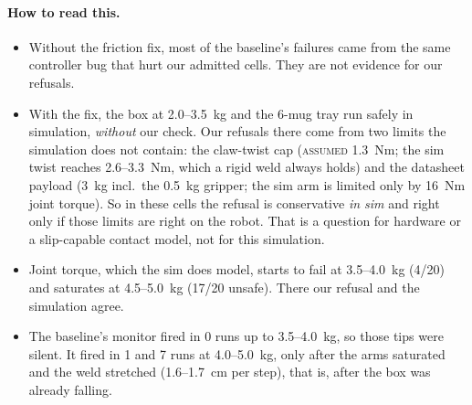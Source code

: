 \documentclass[11pt,a4paper]{article}
\newcommand{\lab}[1]{\textsc{#1}}
\begin{document}
\paragraph{How to read this.}
\begin{itemize}
\item Without the friction fix, most of the baseline's failures came from the same controller bug that hurt our admitted cells.
They are not evidence for our refusals.
\item With the fix, the box at 2.0--3.5~kg and the 6-mug tray run safely in simulation, \emph{without} our check. Our refusals
there come from two limits the simulation does not contain: the claw-twist cap (\lab{assumed} 1.3~Nm; the sim twist reaches
2.6--3.3~Nm, which a rigid weld always holds) and the datasheet payload (3~kg incl.\ the 0.5~kg gripper; the sim arm is limited only
by 16~Nm joint torque). So in these cells the refusal is conservative \emph{in sim} and right only if those limits are right on
the robot. That is a question for hardware or a slip-capable contact model, not for this simulation.
\item Joint torque, which the sim does model, starts to fail at 3.5--4.0~kg (4/20) and saturates at 4.5--5.0~kg (17/20 unsafe).
There our refusal and the simulation agree.
\item The baseline's monitor fired in 0 runs up to 3.5--4.0~kg, so those tips were silent. It fired in 1 and 7 runs at 4.0--5.0~kg,
only after the arms saturated and the weld stretched (1.6--1.7~cm per step), that is, after the box was already falling.
\end{itemize}

\end{document}
